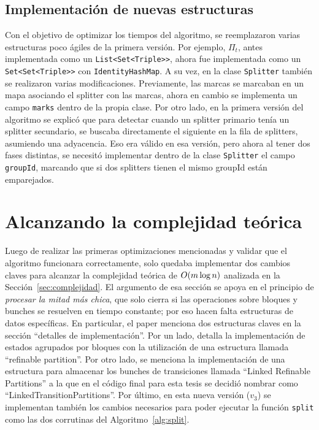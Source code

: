 \subsection{Implementación de nuevas estructuras}
Con el objetivo de optimizar los tiempos del algoritmo, se reemplazaron varias estructuras poco ágiles de la primera versión. Por ejemplo, $\Pi_t$, antes implementada como un \texttt{List\textless Set\textless Triple\textgreater\textgreater}, ahora fue implementada como un \texttt{Set\textless Set\textless Triple\textgreater\textgreater} con \texttt{IdentityHashMap}. A su vez, en la clase \texttt{Splitter} también se realizaron varias modificaciones. Previamente, las marcas se marcaban en un mapa asociando el splitter con las marcas, ahora en cambio se implementa un campo \texttt{marks} dentro de la propia clase. Por otro lado, en la primera versión del algoritmo se explicó que para detectar cuando un splitter primario tenía un splitter secundario, se buscaba directamente el siguiente en la fila de splitters, asumiendo una adyacencia. Eso era válido en esa versión, pero ahora al tener dos fases distintas, se necesitó implementar dentro de la clase \texttt{Splitter} el campo \texttt{groupId}, marcando que si dos splitters tienen el mismo groupId están emparejados.

\section{Alcanzando la complejidad teórica}
\label{sec:v3}

Luego de realizar las primeras optimizaciones mencionadas y validar que el algoritmo funcionara correctamente, solo quedaba implementar dos cambios claves para alcanzar la complejidad teórica de ${O\!\left(m \log n\right)}$ analizada en la Sección~\ref{sec:complejidad}. El argumento de esa sección se apoya en el principio de \textit{procesar la mitad más chica}, que solo cierra si las operaciones sobre bloques y bunches se resuelven en tiempo constante; por eso hacen falta estructuras de datos específicas. En particular, el paper menciona dos estructuras claves en la sección ``detalles de implementación''. Por un lado, detalla la implementación de estados agrupados por bloques con la utilización de una estructura llamada ``refinable partition''. Por otro lado, se menciona la implementación de una estructura para almacenar los bunches de transiciones llamada ``Linked Refinable Partitions'' a la que en el código final para esta tesis se decidió nombrar como ``LinkedTransitionPartitions''. Por último, en esta nueva versión ($v_3$) se implementan también los cambios necesarios para poder ejecutar la función \texttt{split} como las dos corrutinas del Algoritmo~\ref{alg:split}.

